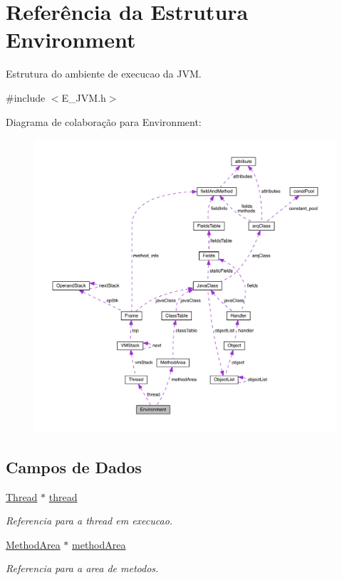 \hypertarget{struct_environment}{}\section{Referência da Estrutura Environment}
\label{struct_environment}


Estrutura do ambiente de execucao da J\+V\+M.  




{\ttfamily \#include $<$E\+\_\+\+J\+V\+M.\+h$>$}



Diagrama de colaboração para Environment\+:\nopagebreak
\begin{figure}[H]
\begin{center}
\leavevmode
\includegraphics[width=350pt]{struct_environment__coll__graph}
\end{center}
\end{figure}
\subsection*{Campos de Dados}
\begin{DoxyCompactItemize}
\item 
\hyperlink{struct_thread}{Thread} $\ast$ \hyperlink{struct_environment_a9521ae1091a45875768bdbbe0a339014}{thread}
\begin{DoxyCompactList}\small\item\em Referencia para a thread em execucao. \end{DoxyCompactList}\item 
\hyperlink{struct_method_area}{Method\+Area} $\ast$ \hyperlink{struct_environment_a1c73c41c6c38e7e67ea22f6d59044852}{method\+Area}
\begin{DoxyCompactList}\small\item\em Referencia para a area de metodos. \end{DoxyCompactList}\end{DoxyCompactItemize}


